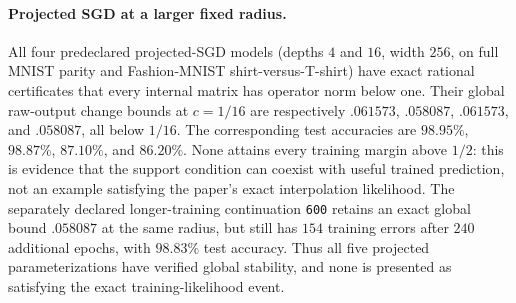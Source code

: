 \paragraph{Projected SGD at a larger fixed radius.}
All four predeclared projected-SGD models (depths $4$ and $16$, width $256$, on full MNIST parity and Fashion-MNIST shirt-versus-T-shirt) have exact rational certificates that every internal matrix has operator norm below one.  Their global raw-output change bounds at $c=1/16$ are respectively $.061573$, $.058087$, $.061573$, and $.058087$, all below $1/16$.  The corresponding test accuracies are $98.95\%$, $98.87\%$, $87.10\%$, and $86.20\%$.  None attains every training margin above $1/2$: this is evidence that the support condition can coexist with useful trained prediction, not an example satisfying the paper's exact interpolation likelihood.
The separately declared longer-training continuation \texttt{600} retains an exact global bound $.058087$ at the same radius, but still has $154$ training errors after $240$ additional epochs, with $98.83\%$ test accuracy.  Thus all five projected parameterizations have verified global stability, and none is presented as satisfying the exact training-likelihood event.
